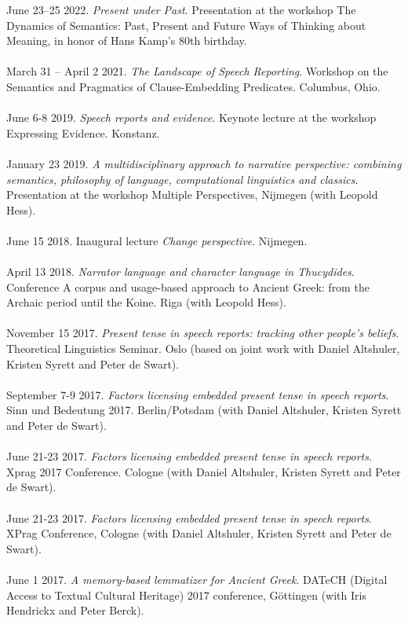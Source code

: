\documentclass[a4paper,11pt]{article}
\begin{document}
June 23--25 2022. \emph{Present under Past}. Presentation at the workshop The Dynamics of Semantics: Past, Present and Future Ways of Thinking about Meaning, in honor of Hans Kamp's 80th birthday.\\\\
March 31 -- April 2 2021. \emph{The Landscape of Speech Reporting}. Workshop on the Semantics and Pragmatics of Clause-Embedding Predicates. Columbus, Ohio.\\\\ 
June 6-8 2019. \emph{Speech reports and evidence}. Keynote lecture at the workshop Expressing Evidence. Konstanz.\\\\
January 23 2019. \emph{A multidisciplinary approach to narrative perspective: combining semantics, philosophy of language, computational linguistics and classics}. Presentation at the workshop Multiple Perspectives, Nijmegen (with Leopold Hess).\\\\
June 15 2018. Inaugural lecture \emph{Change perspective}. Nijmegen.\\\\ 
April 13 2018. \emph{Narrator language and character language in Thucydides}. Conference A corpus and usage-based approach to Ancient Greek: from the Archaic period until the Koine. Riga (with Leopold Hess).\\\\
November 15 2017. \emph{Present tense in speech reports: tracking other people's beliefs}. Theoretical Linguistics Seminar. Oslo (based on joint work with Daniel Altshuler, Kristen Syrett and Peter de Swart).\\\\
September 7-9 2017. \emph{Factors licensing embedded present tense in speech reports}. Sinn und Bedeutung 2017. Berlin/Potsdam (with Daniel Altshuler, Kristen Syrett and Peter de Swart).\\\\
June 21-23 2017. \emph{Factors licensing embedded present tense in speech reports}. Xprag 2017 Conference. Cologne (with Daniel Altshuler, Kristen Syrett and Peter de Swart).\\\\
June 21-23 2017. \emph{Factors licensing embedded present tense in speech reports}. XPrag Conference, Cologne (with Daniel Altshuler, Kristen Syrett and Peter de Swart).\\\\
June 1 2017. \emph{A memory-based lemmatizer for Ancient Greek}. DATeCH (Digital Access to Textual Cultural Heritage) 2017 conference, G\"ottingen (with Iris Hendrickx and Peter Berck).\\\\
\end{document}
